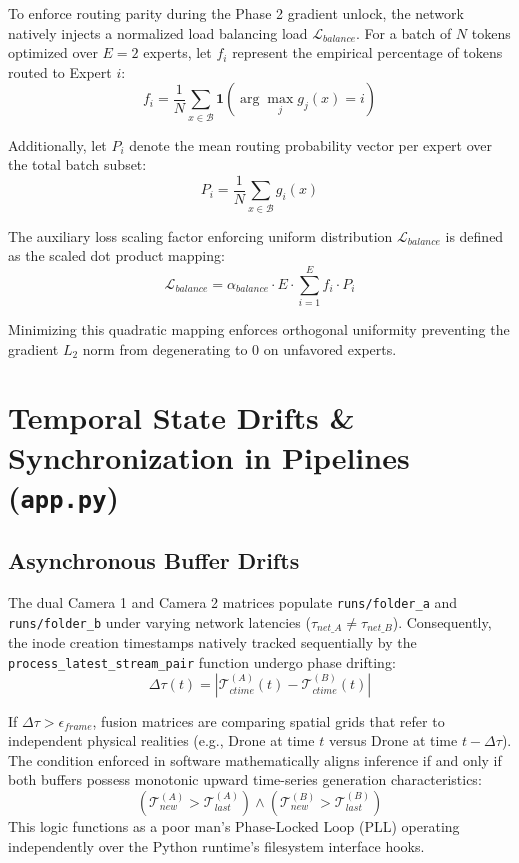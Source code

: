 \documentclass[11pt, letterpaper, oneside, openany]{book}
\begin{document}
To enforce routing parity during the Phase 2 gradient unlock, the network natively injects a normalized load balancing load $\mathcal{L}_{balance}$. For a batch of $N$ tokens optimized over $E=2$ experts, let $f_i$ represent the empirical percentage of tokens routed to Expert $i$:
\begin{equation}
    f_i = \frac{1}{N} \sum_{x \in \mathcal{B}} \mathbf{1}\left( \arg\max_j g_j(x) = i \right)
\end{equation}

Additionally, let $P_i$ denote the mean routing probability vector per expert over the total batch subset:
\begin{equation}
    P_i = \frac{1}{N} \sum_{x \in \mathcal{B}} g_i(x)
\end{equation}

The auxiliary loss scaling factor enforcing uniform distribution $\mathcal{L}_{balance}$ is defined as the scaled dot product mapping:
\begin{equation}
    \mathcal{L}_{balance} = \alpha_{balance} \cdot E \cdot \sum_{i=1}^{E} f_i \cdot P_i
\end{equation}

Minimizing this quadratic mapping enforces orthogonal uniformity preventing the gradient $L_2$ norm from degenerating to 0 on unfavored experts. 

\chapter{Temporal State Drifts \& Synchronization in Pipelines (\texttt{app.py})}

\section{Asynchronous Buffer Drifts}
The dual Camera 1 and Camera 2 matrices populate \texttt{runs/folder\_a} and \texttt{runs/folder\_b} under varying network latencies ($\tau_{net\_A} \neq \tau_{net\_B}$). Consequently, the inode creation timestamps natively tracked sequentially by the \texttt{process\_latest\_stream\_pair} function undergo phase drifting:
\begin{equation}
    \Delta \tau(t) = | \mathcal{T}_{ctime}^{(A)}(t) - \mathcal{T}_{ctime}^{(B)}(t) |
\end{equation}

If $\Delta \tau > \epsilon_{frame}$, fusion matrices are comparing spatial grids that refer to independent physical realities (e.g., Drone at time $t$ versus Drone at time $t - \Delta \tau$). The condition enforced in software mathematically aligns inference if and only if both buffers possess monotonic upward time-series generation characteristics:
\begin{equation}
    (\mathcal{T}_{new}^{(A)} > \mathcal{T}_{last}^{(A)}) \land (\mathcal{T}_{new}^{(B)} > \mathcal{T}_{last}^{(B)})
\end{equation}
This logic functions as a poor man's Phase-Locked Loop (PLL) operating independently over the Python runtime's filesystem interface hooks.
\end{document}
